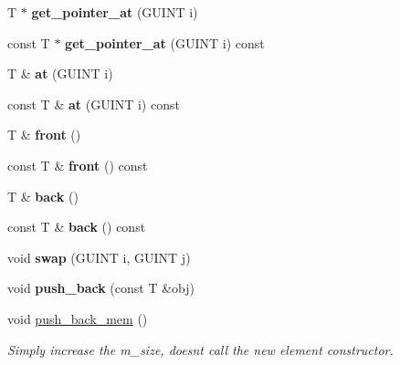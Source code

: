 \begin{DoxyCompactItemize}
T $\ast$ {\bfseries get\+\_\+pointer\+\_\+at} (G\+U\+I\+NT i)
\item 
\mbox{\label{classgim__array_ad406b937dd8e791fbb8234cb92b3d943}} 
const T $\ast$ {\bfseries get\+\_\+pointer\+\_\+at} (G\+U\+I\+NT i) const
\item 
\mbox{\label{classgim__array_ae76ad8c556a353a67d4331a9def31676}} 
T \& {\bfseries at} (G\+U\+I\+NT i)
\item 
\mbox{\label{classgim__array_a6123b8cb4fc75751430778a4f2376627}} 
const T \& {\bfseries at} (G\+U\+I\+NT i) const
\item 
\mbox{\label{classgim__array_a60fc3e0355cfdc09cc169c1c595d5d1b}} 
T \& {\bfseries front} ()
\item 
\mbox{\label{classgim__array_a4a19fa926c2d9d8752c3ca73db8b3a17}} 
const T \& {\bfseries front} () const
\item 
\mbox{\label{classgim__array_aab58b1694b45fbd101c64258ac105669}} 
T \& {\bfseries back} ()
\item 
\mbox{\label{classgim__array_a5770ffb08d3c5e27e099d5809bb23a1b}} 
const T \& {\bfseries back} () const
\item 
\mbox{\label{classgim__array_a99a6869a790e5d746d455b56f1d65e32}} 
void {\bfseries swap} (G\+U\+I\+NT i, G\+U\+I\+NT j)
\item 
\mbox{\label{classgim__array_a45b9c313cf887ed8a2fd6d1895b2c309}} 
void {\bfseries push\+\_\+back} (const T \&obj)
\item 
\mbox{\label{classgim__array_acbd3ad9a6756d0b91e42549a0e7107f0}} 
void \hyperlink{classgim__array_acbd3ad9a6756d0b91e42549a0e7107f0}{push\+\_\+back\+\_\+mem} ()
\begin{DoxyCompactList}\small\item\em Simply increase the m\+\_\+size, doesn\textquotesingle{}t call the new element constructor. \end{DoxyCompactList}\item 

\end{DoxyCompactItemize}
